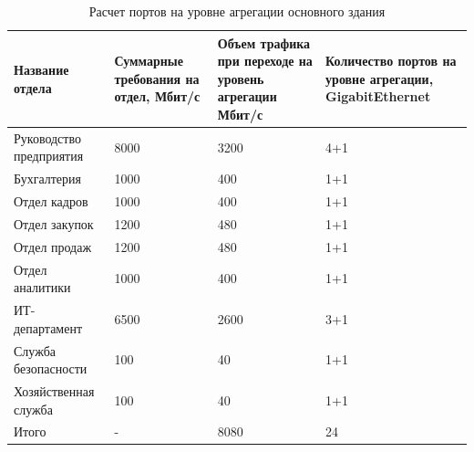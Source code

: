 \begin{table}[H]
    \centering
	\caption{Расчет портов на уровне агрегации основного здания\label{table:agr_ports_oz}}
    \small
	\begin{tabularx}{\textwidth}{|X|X|X|X|}
        \hline
		Название отдела&Суммарные требования на отдел, Мбит/с & Объем трафика при переходе на уровень агрегации Мбит/с &Количество портов на уровне агрегации, GigabitEthernet \\
        \hline
		Руководство предприятия         &	8000  & 3200 & 4+1	\\
		\hline
		Бухгалтерия						&	1000  & 400 & 1+1	\\
        \hline
		Отдел кадров					&	1000  & 400 & 1+1 \\
        \hline
		Отдел закупок					&	1200  & 480 & 1+1\\
        \hline
		Отдел продаж					&	1200  & 480 & 1+1 \\
        \hline
		Отдел аналитики					&	1000  & 400 & 1+1 \\
        \hline
		ИТ-департамент					&	6500  & 2600 & 3+1 \\
        \hline
		Служба безопасности				&	100	  & 40 & 1+1 \\
		\hline
		Хозяйственная служба			&	100   & 40 & 1+1 \\
        \hline
		Итого							& -		 & 8080 & 24\\
		\hline
    \end{tabularx}
\end{table}


